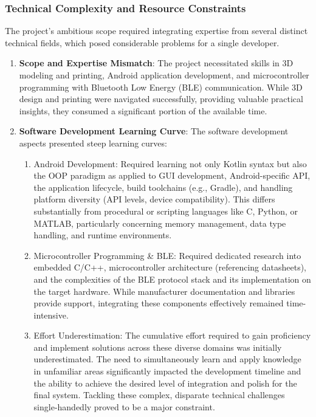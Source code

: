 \subsubsection{Technical Complexity and Resource Constraints}

The project's ambitious scope required integrating expertise from several distinct technical fields, which posed considerable problems for a single developer.
\begin{enumerate}
	\item \textbf{Scope and Expertise Mismatch}: The project necessitated skills in 3D modeling and printing, Android application development, and microcontroller programming with Bluetooth Low Energy (BLE) communication. While 3D design and printing were navigated successfully, providing valuable practical insights, they consumed a significant portion of the available time.
	\item \textbf{Software Development Learning Curve}: The software development aspects presented steep learning curves:
	\begin{enumerate}
		\item Android Development: Required learning not only Kotlin syntax but also the \ac{OOP} paradigm as applied to GUI development, Android-specific \ac{API}, the application lifecycle, build toolchains (e.g., Gradle), and handling platform diversity (\ac{API} levels, device compatibility). This differs substantially from procedural or scripting languages like C, Python, or MATLAB, particularly concerning memory management, data type handling, and runtime environments.
		
		\item Microcontroller Programming \& \ac{BLE}: Required dedicated research into embedded C/C++, microcontroller architecture (referencing datasheets), and the complexities of the BLE protocol stack and its implementation on the target hardware. While manufacturer documentation and libraries provide support, integrating these components effectively remained time-intensive.
		
		\item Effort Underestimation: The cumulative effort required to gain proficiency and implement solutions across these diverse domains was initially underestimated. The need to simultaneously learn and apply knowledge in unfamiliar areas significantly impacted the development timeline and the ability to achieve the desired level of integration and polish for the final system. Tackling these complex, disparate technical challenges single-handedly proved to be a major constraint.
	\end{enumerate}
\end{enumerate}
\newpage
